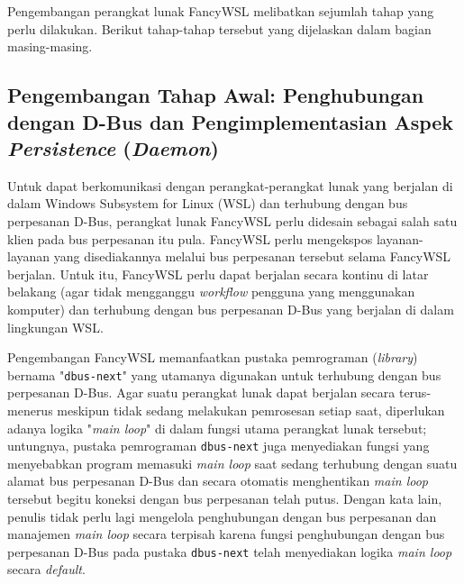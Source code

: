 Pengembangan perangkat lunak FancyWSL melibatkan sejumlah tahap yang perlu dilakukan. Berikut tahap-tahap tersebut yang dijelaskan dalam bagian masing-masing.

\subsection{Pengembangan Tahap Awal: Penghubungan dengan D-Bus dan Pengimplementasian Aspek \textit{Persistence} (\textit{Daemon})}

Untuk dapat berkomunikasi dengan perangkat-perangkat lunak yang berjalan di dalam Windows Subsystem for Linux (WSL) dan terhubung dengan bus perpesanan D-Bus, perangkat lunak FancyWSL perlu didesain sebagai salah satu klien pada bus perpesanan itu pula. FancyWSL perlu mengekspos layanan-layanan yang disediakannya melalui bus perpesanan tersebut selama FancyWSL berjalan. Untuk itu, FancyWSL perlu dapat berjalan secara kontinu di latar belakang (agar tidak mengganggu \textit{workflow} pengguna yang menggunakan komputer) dan terhubung dengan bus perpesanan D-Bus yang berjalan di dalam lingkungan WSL.

Pengembangan FancyWSL memanfaatkan pustaka pemrograman (\textit{library}) bernama "\verb|dbus-next|" yang utamanya digunakan untuk terhubung dengan bus perpesanan D-Bus. Agar suatu perangkat lunak dapat berjalan secara terus-menerus meskipun tidak sedang melakukan pemrosesan setiap saat, diperlukan adanya logika "\textit{main loop}" di dalam fungsi utama perangkat lunak tersebut; untungnya, pustaka pemrograman \verb|dbus-next| juga menyediakan fungsi yang menyebabkan program memasuki \textit{main loop} saat sedang terhubung dengan suatu alamat bus perpesanan D-Bus dan secara otomatis menghentikan \textit{main loop} tersebut begitu koneksi dengan bus perpesanan telah putus. Dengan kata lain, penulis tidak perlu lagi mengelola penghubungan dengan bus perpesanan dan manajemen \textit{main loop} secara terpisah karena fungsi penghubungan dengan bus perpesanan D-Bus pada pustaka \verb|dbus-next| telah menyediakan logika \textit{main loop} secara \textit{default}.

